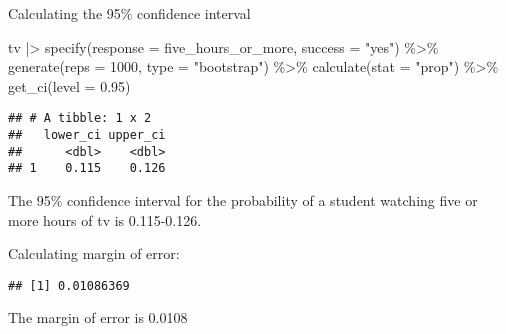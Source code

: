 \documentclass[
]{article}
\newenvironment{Shaded}{\begin{snugshade}}{\end{snugshade}}
\newcommand{\AttributeTok}[1]{\textcolor[rgb]{0.77,0.63,0.00}{#1}}
\newcommand{\CommentTok}[1]{\textcolor[rgb]{0.56,0.35,0.01}{\textit{#1}}}
\newcommand{\DecValTok}[1]{\textcolor[rgb]{0.00,0.00,0.81}{#1}}
\newcommand{\FloatTok}[1]{\textcolor[rgb]{0.00,0.00,0.81}{#1}}
\newcommand{\FunctionTok}[1]{\textcolor[rgb]{0.00,0.00,0.00}{#1}}
\newcommand{\NormalTok}[1]{#1}
\newcommand{\OtherTok}[1]{\textcolor[rgb]{0.56,0.35,0.01}{#1}}
\newcommand{\SpecialCharTok}[1]{\textcolor[rgb]{0.00,0.00,0.00}{#1}}
\newcommand{\StringTok}[1]{\textcolor[rgb]{0.31,0.60,0.02}{#1}}
\begin{document}
Calculating the 95\% confidence interval

\begin{Shaded}
\begin{Highlighting}[]
\NormalTok{tv }\SpecialCharTok{|\textgreater{}}
  \FunctionTok{specify}\NormalTok{(}\AttributeTok{response =}\NormalTok{ five\_hours\_or\_more, }\AttributeTok{success =} \StringTok{"yes"}\NormalTok{) }\SpecialCharTok{\%\textgreater{}\%}
  \FunctionTok{generate}\NormalTok{(}\AttributeTok{reps =} \DecValTok{1000}\NormalTok{, }\AttributeTok{type =} \StringTok{"bootstrap"}\NormalTok{) }\SpecialCharTok{\%\textgreater{}\%}
  \FunctionTok{calculate}\NormalTok{(}\AttributeTok{stat =} \StringTok{"prop"}\NormalTok{) }\SpecialCharTok{\%\textgreater{}\%}
  \FunctionTok{get\_ci}\NormalTok{(}\AttributeTok{level =} \FloatTok{0.95}\NormalTok{)}
\end{Highlighting}
\end{Shaded}

\begin{verbatim}
## # A tibble: 1 x 2
##   lower_ci upper_ci
##      <dbl>    <dbl>
## 1    0.115    0.126
\end{verbatim}

The 95\% confidence interval for the probability of a student watching
five or more hours of tv is 0.115-0.126.

Calculating margin of error:

\begin{Shaded}
\end{Shaded}

\begin{verbatim}
## [1] 0.01086369
\end{verbatim}

The margin of error is 0.0108
\end{document}
